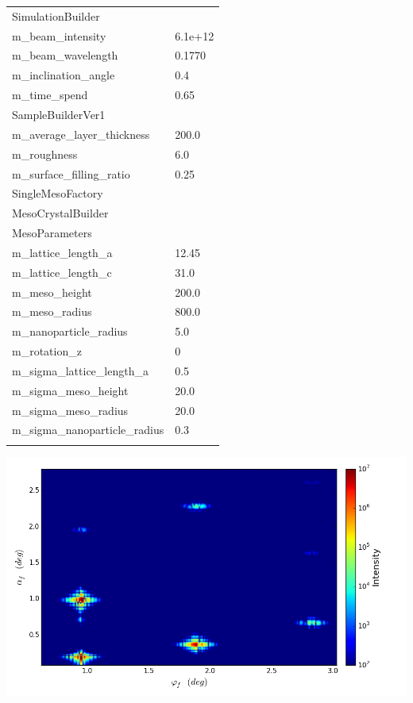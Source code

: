 \documentclass[landscape]{article}%
\begin{document}
%
\newpage%
\begin{minipage}{0.3\textwidth}%
\begin{tabular}{l l}%
\hline%
\hline%
& \\%
\hline%
SimulationBuilder& \\%
m\_beam\_intensity               & 6.1e+12\\%
m\_beam\_wavelength              & 0.1770\\%
m\_inclination\_angle            & 0.4\\%
m\_time\_spend                   & 0.65\\%
\hline%
SampleBuilderVer1& \\%
m\_average\_layer\_thickness      & 200.0\\%
m\_roughness                    & 6.0\\%
m\_surface\_filling\_ratio        & 0.25\\%
\hline%
SingleMesoFactory& \\%
\hline%
MesoCrystalBuilder& \\%
\hline%
MesoParameters& \\%
m\_lattice\_length\_a             & 12.45\\%
m\_lattice\_length\_c             & 31.0\\%
m\_meso\_height                  & 200.0\\%
m\_meso\_radius                  & 800.0\\%
m\_nanoparticle\_radius          & 5.0\\%
m\_rotation\_z                   & 0\\%
m\_sigma\_lattice\_length\_a       & 0.5\\%
m\_sigma\_meso\_height            & 20.0\\%
m\_sigma\_meso\_radius            & 20.0\\%
m\_sigma\_nanoparticle\_radius    & 0.3\\%
\hline%
& \\%
\end{tabular}%
\end{minipage}%
\begin{minipage}{0.6\textwidth}%
\includegraphics[scale=0.5]{meso.png}%
\end{minipage}%
\newpage%
\end{document}
